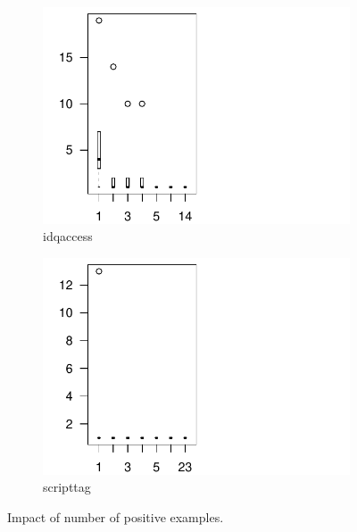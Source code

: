 \documentclass[conference]{IEEEtran}
\begin{document}
 
\begin{figure}[t!]
  \centering
  \begin{subfigure}{.2\textwidth}
    \centering
    \includegraphics[scale=0.35,trim=20 0 130 0,clip]{R/idqaccess/idqaccess.pdf}
    \caption{idqaccess}
  \end{subfigure}%
  \begin{subfigure}{.2\textwidth}
    \centering
    \includegraphics[scale=0.35,trim=15 0 130 0,clip]{R/scripttag/scripttag.pdf}
    \caption{scripttag}    
  \end{subfigure}%
\caption{Impact of number of positive examples.}
\label{fig:impact-number-attacks}
\end{figure}
\end{document}
